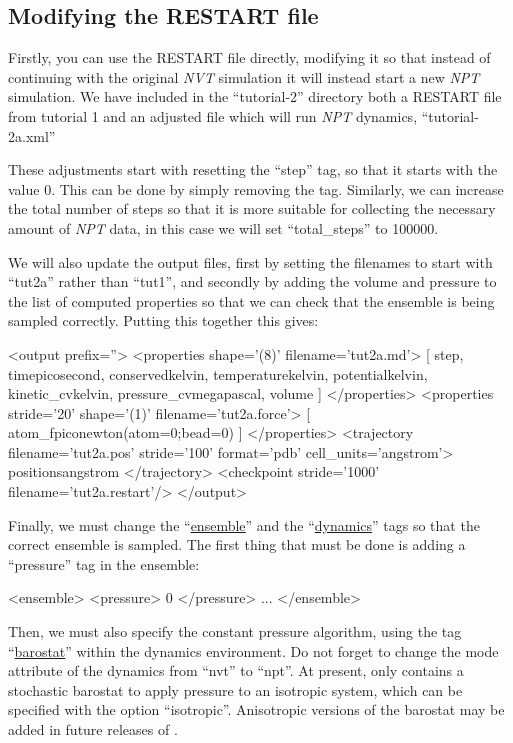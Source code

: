 \documentclass[11pt,english,fleqn]{report}
\newenvironment{code}{%
\footnotesize 
\verbatim
}{
\endverbatim
\normalsize
}
\begin{document}
\subsection{Modifying the RESTART file}

Firstly, you can use the RESTART file directly, modifying it
so that instead of continuing with the original \emph{NVT} simulation
it will instead start a new \emph{NPT} simulation. We have included
in the {}``tutorial-2'' directory both a RESTART file from
tutorial 1 and an adjusted file which will run \emph{NPT} dynamics,
{}``tutorial-2a.xml''

These adjustments start with resetting the {}``step'' tag, so that
it starts with the value 0. This can be done by simply removing the
tag. Similarly, we can increase the total number of
steps so that it is more suitable for collecting the necessary
amount of {\em NPT} data, in this case we will set
{}``total\_steps'' to 100000.

We will also update the output files, first by setting the filenames
to start with {}``tut2a'' rather than {}``tut1'', and secondly by adding
the volume and pressure to the list of computed properties so that
we can check that the ensemble is being sampled correctly.
Putting this together this gives:

\begin{code}
<output prefix=''>
   <properties shape='(8)' filename='tut2a.md'>
      [ step, time{picosecond}, conserved{kelvin}, 
        temperature{kelvin}, potential{kelvin}, kinetic_cv{kelvin}, 
        pressure_cv{megapascal}, volume ] 
   </properties>
   <properties stride='20' shape='(1)' filename='tut2a.force'> 
      [ atom_f{piconewton}(atom=0;bead=0) ] 
   </properties>
   <trajectory filename='tut2a.pos' stride='100' format='pdb' cell_units='angstrom'>
      positions{angstrom}
   </trajectory>
   <checkpoint stride='1000' filename='tut2a.restart'/>
</output>
\end{code}

Finally, we must change the {}``\hyperref[ENSEMBLE]{ensemble}'' 
and the {}``\hyperref[DYNAMICS]{dynamics}'' tags so that the correct
ensemble is sampled. The first thing that must be done is
adding a {}``pressure'' tag in the ensemble:

\begin{code}
<ensemble>
   <pressure> 0 </pressure>
   ...
</ensemble>
\end{code}

Then, we must also specify the constant pressure algorithm,
using the tag {}``\hyperref[BAROSTAT]{barostat}'' within the dynamics
environment. Do not forget to change the mode attribute of the
dynamics from ``nvt'' to ``npt''.
At present, \ipi only contains a stochastic barostat to apply pressure
to an isotropic system, which can be specified with the option ``isotropic''. 
Anisotropic versions of the barostat may be added in future releases of \ipi. 
\end{document}
